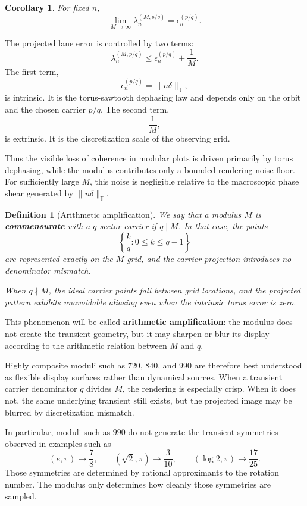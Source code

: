 \documentclass[11pt]{article}
\newtheorem{definition}[theorem]{Definition}
\newtheorem{corollary}[theorem]{Corollary}
\newcommand{\T}{\mathbb{T}}
\begin{document}
\begin{corollary}
For fixed $n$,
\[
\lim_{M\to\infty}\lambda_n^{(M,p/q)}=\epsilon_n^{(p/q)}.
\]
\end{corollary}

The projected lane error is controlled by two terms:
\[
\lambda_n^{(M,p/q)}
\le
\epsilon_n^{(p/q)}+\frac{1}{M}.
\]
The first term,
\[
\epsilon_n^{(p/q)}=\lVert n\delta\rVert_{\T},
\]
is intrinsic. It is the torus-sawtooth dephasing law and depends only on the orbit and the chosen carrier $p/q$. The second term,
\[
\frac{1}{M},
\]
is extrinsic. It is the discretization scale of the observing grid.

Thus the visible loss of coherence in modular plots is driven primarily by torus dephasing, while the modulus contributes only a bounded rendering noise floor. For sufficiently large $M$, this noise is negligible relative to the macroscopic phase shear generated by $\lVert n\delta\rVert_{\T}$.

\begin{definition}[Arithmetic amplification]
We say that a modulus $M$ is \textbf{commensurate} with a $q$-sector carrier if $q\mid M$. In that case, the points
\[
\left\{\frac{k}{q}:0\le k\le q-1\right\}
\]
are represented exactly on the $M$-grid, and the carrier projection introduces no denominator mismatch.

When $q\nmid M$, the ideal carrier points fall between grid locations, and the projected pattern exhibits unavoidable aliasing even when the intrinsic torus error is zero.
\end{definition}

This phenomenon will be called \textbf{arithmetic amplification}: the modulus does not create the transient geometry, but it may sharpen or blur its display according to the arithmetic relation between $M$ and $q$.

Highly composite moduli such as $720$, $840$, and $990$ are therefore best understood as flexible display surfaces rather than dynamical sources. When a transient carrier denominator $q$ divides $M$, the rendering is especially crisp. When it does not, the same underlying transient still exists, but the projected image may be blurred by discretization mismatch.

In particular, moduli such as $990$ do not generate the transient symmetries observed in examples such as
\[
(e,\pi)\to \frac78,
\qquad
(\sqrt2,\pi)\to \frac3{10},
\qquad
(\log2,\pi)\to \frac{17}{25}.
\]
Those symmetries are determined by rational approximants to the rotation number. The modulus only determines how cleanly those symmetries are sampled.
\end{document}

